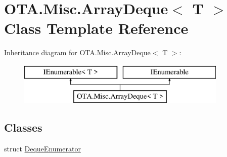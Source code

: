 \hypertarget{class_o_t_a_1_1_misc_1_1_array_deque}{}\section{O\+T\+A.\+Misc.\+Array\+Deque$<$ T $>$ Class Template Reference}
\label{class_o_t_a_1_1_misc_1_1_array_deque}
Inheritance diagram for O\+T\+A.\+Misc.\+Array\+Deque$<$ T $>$\+:\begin{figure}[H]
\begin{center}
\leavevmode
\includegraphics[height=2.000000cm]{class_o_t_a_1_1_misc_1_1_array_deque}
\end{center}
\end{figure}
\subsection*{Classes}
\begin{DoxyCompactItemize}
\item 
struct \hyperlink{struct_o_t_a_1_1_misc_1_1_array_deque_1_1_deque_enumerator}{Deque\+Enumerator}
\end{DoxyCompactItemize}
